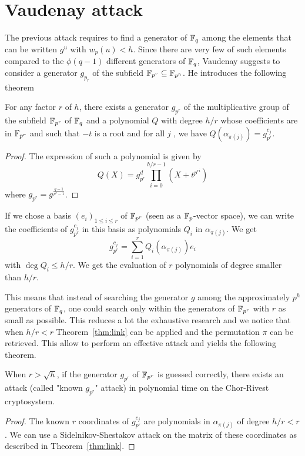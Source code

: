 \documentclass[a4paper]{article}
\newcommand{\GF}[1]{\F_{#1}}
\begin{document}
\section{Vaudenay attack}
\label{sec:Vau}

The previous attack requires to find a generator of $\mathbb{F}_q$ among the elements that can be written $g^u$ with $w_p(u) < h$. Since there are very few of such elements compared to the $\phi(q-1)$ different generators of $\mathbb{F}_q$, Vaudenay suggests \cite{Vau01} to consider a generator $g_{p_r}$ of the subfield $\mathbb{F}_{p^r} \subseteq \mathbb{F}_{p^h}$. He introduces the following theorem
\begin{theorem}
For any factor $r$ of $h$, there exists a generator $g_{p^r}$ of the multiplicative group of the subfield $\mathbb{F}_{p^r}$ of $\mathbb{F}_q$ and a polynomial $Q$ with degree $h/r$ whose coefficients are in $\mathbb{F}_{p^r}$ and such that $-t$ is a root and for all $j$ , we have $Q(\alpha_{\pi(j)}) = g_{p^r}^{c_j}$.
\end{theorem}
\begin{proof}
The expression of such a polynomial is given by
$$ Q(X) = g_{p^r}^d \prod_{i=0}^{h/r-1} \left( X + t^{p^{ri}} \right) $$
where $g_{p^r} = g^{\frac{q-1}{p^r-1}}$. 
\end{proof}

If we chose a basis $(e_i)_{1 \leq i \leq r}$ of $\GF{p^r}$ (seen as a $\mathbb{F}_p$-vector space), we can write the coefficients of $g_{p^r}^{c_j}$ in this basis as polynomials $Q_i$ in $\alpha_{\pi(j)}$. We get
$$ g_{p^r}^{c_j} = \sum_{i=1}^r Q_i(\alpha_{\pi(j)}) e_i $$
with $\deg Q_i \leq h/r$. We get the evaluation of $r$ polynomials of degree smaller than $h/r$.

This means that instead of searching the generator $g$ among the approximately $p^h$ generators of $\mathbb{F}_q$, one could search only within the generators of $\mathbb{F}_{p^r}$ with $r$ as small as possible. This reduces a lot the exhaustive research and we notice that when $h/r < r$ Theorem~\ref{thm:link} can be applied and the permutation $\pi$ can be retrieved. This allow to perform an effective attack and yields the following theorem.

\begin{theorem}
When $r > \sqrt{h}$, if the generator $g_{p^r}$ of $\GF{p^r}$ is guessed correctly, there exists an attack (called "known $g_{p^r}$" attack) in polynomial time on the Chor-Rivest cryptosystem.
\end{theorem}
\begin{proof}
The known $r$ coordinates of $g_{p^r}^{c_j}$ are polynomials in $\alpha_{\pi(j)}$ of degree $h/r < r$. We can use a Sidelnikov-Shestakov attack on the matrix of these coordinates as described in Theorem~\ref{thm:link}.
\end{proof}
\end{document}
